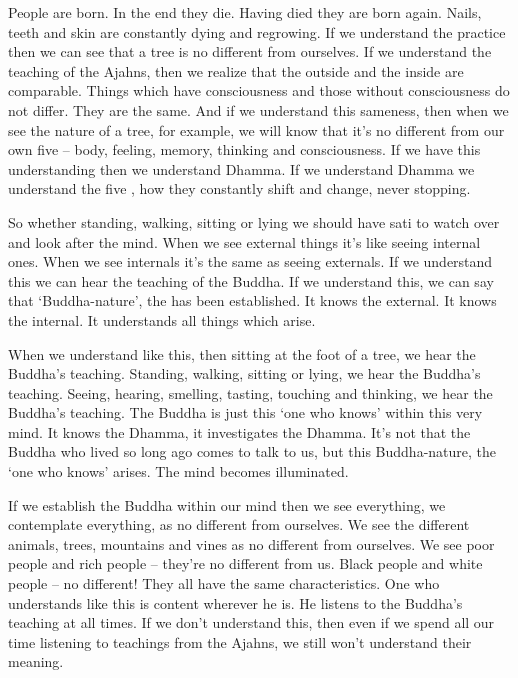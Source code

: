 People are born. In the end they die. Having died they are born again. Nails, teeth and skin are constantly dying and regrowing. If we understand the practice then we can see that a tree is no different from ourselves. If we understand the teaching of the Ajahns, then we realize that the outside and the inside are comparable. Things which have consciousness and those without consciousness do not differ. They are the same. And if we understand this sameness, then when we see the nature of a tree, for example, we will know that it's no different from our own five  -- body, feeling, memory, thinking and consciousness. If we have this understanding then we understand Dhamma. If we understand Dhamma we understand the five , how they constantly shift and change, never stopping. 

So whether standing, walking, sitting or lying we should have sati to watch over and look after the mind. When we see external things it's like seeing internal ones. When we see internals it's the same as seeing externals. If we understand this we can hear the teaching of the Buddha. If we understand this, we can say that `Buddha-nature', the  has been established. It knows the external. It knows the internal. It understands all things which arise. 

When we understand like this, then sitting at the foot of a tree, we hear the Buddha's teaching. Standing, walking, sitting or lying, we hear the Buddha's teaching. Seeing, hearing, smelling, tasting, touching and thinking, we hear the Buddha's teaching. The Buddha is just this `one who knows' within this very mind. It knows the Dhamma, it investigates the Dhamma. It's not that the Buddha who lived so long ago comes to talk to us, but this Buddha-nature, the `one who knows' arises. The mind becomes illuminated. 

If we establish the Buddha within our mind then we see everything, we contemplate everything, as no different from ourselves. We see the different animals, trees, mountains and vines as no different from ourselves. We see poor people and rich people -- they're no different from us. Black people and white people -- no different! They all have the same characteristics. One who understands like this is content wherever he is. He listens to the Buddha's teaching at all times. If we don't understand this, then even if we spend all our time listening to teachings from the Ajahns, we still won't understand their meaning. 

